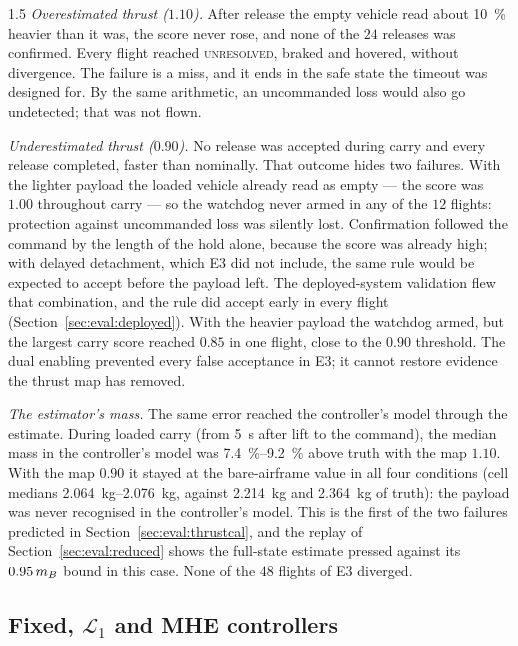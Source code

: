 \begin{spacing}{1.5}
\emph{Overestimated thrust ($1.10$).} After release the empty vehicle read about
\SI{10}{\percent} heavier than it was, the score never rose, and none of the
$24$ releases was confirmed. Every flight reached \textsc{unresolved}, braked and
hovered, without divergence. The failure is a miss, and it ends in the safe
state the timeout was designed for. By the same arithmetic, an uncommanded loss
would also go undetected; that was not flown.

\emph{Underestimated thrust ($0.90$).} No release was accepted during carry and
every release completed, faster than nominally. That outcome hides two
failures. With the lighter payload the loaded vehicle already read as empty
--- the score was $1.00$ throughout carry --- so the watchdog never armed in any
of the $12$ flights: protection against uncommanded loss was silently lost.
Confirmation followed the command by the length of the hold alone, because the
score was already high; with delayed detachment, which E3 did not include, the
same rule would be expected to accept before the payload left. The deployed-system
validation flew that combination, and the rule did accept early in every flight
(Section~\ref{sec:eval:deployed}). With the heavier
payload the watchdog armed, but the largest carry score reached $0.85$ in one
flight, close to the $0.90$ threshold. The dual enabling prevented every false
acceptance in E3; it cannot restore evidence the thrust map has removed.

\emph{The estimator's mass.} The same error reached the controller's model
through the estimate. During loaded carry (from \SI{5}{\second} after lift to the
command), the median mass in the controller's model was
\SIrange{7.4}{9.2}{\percent} above truth with the map $1.10$. With the map $0.90$
it stayed at the bare-airframe value in all four conditions (cell medians
\SIrange{2.064}{2.076}{\kg}, against \SI{2.214}{\kg} and \SI{2.364}{\kg} of truth):
the payload was never recognised in the controller's model. This is the first of
the two failures predicted in Section~\ref{sec:eval:thrustcal}, and the replay of
Section~\ref{sec:eval:reduced} shows the full-state estimate pressed against its
$0.95\,m_B$ bound in this case. None of the $48$ flights of E3 diverged.

\subsection{Fixed, $\mathcal{L}_1$ and MHE controllers}\label{sec:eval:camp:ctrl}


\end{spacing}
